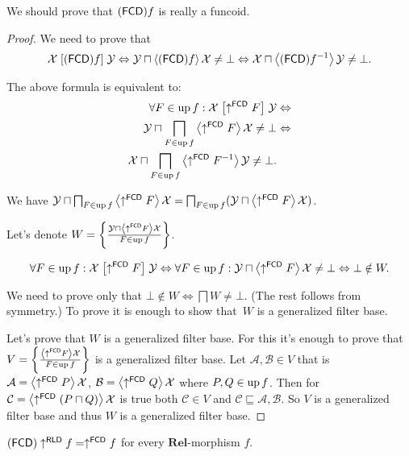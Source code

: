 We should prove that $(\mathsf{FCD}) f$ is really a funcoid.
\begin{proof}
We need to prove that
\[
\mathcal{X}\mathrel{\left[(\mathsf{FCD}) f\right]}\mathcal{Y}\Leftrightarrow\mathcal{Y}\sqcap\left\langle (\mathsf{FCD}) f\right\rangle\mathcal{X}\ne\bot\Leftrightarrow
\mathcal{X}\sqcap\left\langle (\mathsf{FCD}) f^{-1}\right\rangle\mathcal{Y}\ne\bot.
\]


The above formula is equivalent to:
\begin{align*}
\forall F\in\operatorname{up} f:\mathcal{X}\mathrel{\left[\uparrow^{\mathsf{FCD}}F\right]}\mathcal{Y} & \Leftrightarrow\\
\mathcal{Y}\sqcap\bigsqcap_{F\in\operatorname{up} f}\left\langle \uparrow^{\mathsf{FCD}}F\right\rangle\mathcal{X}\ne\bot & \Leftrightarrow\\
\mathcal{X}\sqcap\bigsqcap_{F\in\operatorname{up} f}\left\langle \uparrow^{\mathsf{FCD}}F^{-1}\right\rangle\mathcal{Y}\ne\bot.
\end{align*}


We have $\mathcal{Y}\sqcap\bigsqcap_{F\in\operatorname{up} f}\left\langle \uparrow^{\mathsf{FCD}}F\right\rangle\mathcal{X}=\bigsqcap_{F\in\operatorname{up} f}(\mathcal{Y}\sqcap\left\langle \uparrow^{\mathsf{FCD}}F\right\rangle\mathcal{X})$.

Let's denote $W=\left\{ \frac{\mathcal{Y}\sqcap\left\langle \uparrow^{\mathsf{FCD}}F\right\rangle\mathcal{X}}{F\in\operatorname{up} f}\right\}$.

\[
\forall F\in\operatorname{up} f:\mathcal{X}\mathrel{\left[\uparrow^{\mathsf{FCD}}F\right]}\mathcal{Y} \Leftrightarrow
\forall F\in\operatorname{up} f:\mathcal{Y}\sqcap\left\langle \uparrow^{\mathsf{FCD}}F\right\rangle\mathcal{X}\ne\bot\Leftrightarrow\bot\notin W.
\]


We need to prove only that $\bot\notin W\Leftrightarrow\bigsqcap W\ne\bot$.
(The rest follows from symmetry.) To prove it is enough to show that~$W$ is a generalized filter base.

Let's prove that $W$ is a generalized filter base. For this it's
enough to prove that $V=\left\{ \frac{\left\langle \uparrow^{\mathsf{FCD}}F\right\rangle\mathcal{X}}{F\in\operatorname{up} f}\right\}$
is a generalized filter base. Let $\mathcal{A},\mathcal{B}\in V$
that is $\mathcal{A}=\left\langle \uparrow^{\mathsf{FCD}}P\right\rangle\mathcal{X}$,
$\mathcal{B}=\left\langle \uparrow^{\mathsf{FCD}}Q\right\rangle\mathcal{X}$ where
$P,Q\in\operatorname{up} f$. Then for $\mathcal{C}=\left\langle \uparrow^{\mathsf{FCD}}(P\sqcap Q)\right\rangle\mathcal{X}$
is true both $\mathcal{C}\in V$ and $\mathcal{C}\sqsubseteq\mathcal{A},\mathcal{B}$.
So $V$ is a generalized filter base and thus $W$ is a generalized
filter base.\end{proof}
\begin{prop}
\label{fcd-discr}$(\mathsf{FCD})\uparrow^{\mathsf{RLD}}f=\uparrow^{\mathsf{FCD}}f$
for every $\mathbf{Rel}$-morphism $f$.\end{prop}
